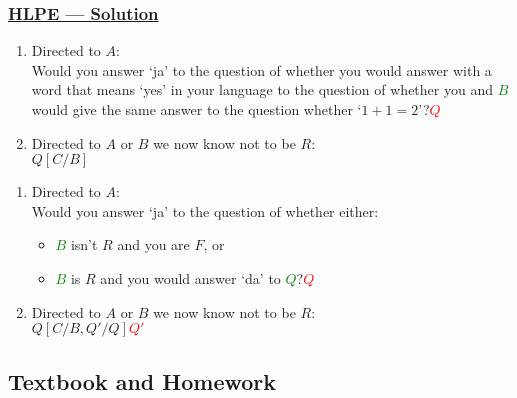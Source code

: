 \documentclass[UTF8,11pt,colorlinks,compress,openany]{beamer}%
\begin{document}
\begin{frame}\frametitle{\href{http://philsci-archive.pitt.edu/9490/1/devious.pdf}{HLPE --- Solution}}
\vspace{-3pt}
\setlength\abovedisplayskip{0pt}
\setlength\belowdisplayskip{0pt}
	\begin{solution}
		\begin{enumerate}
			\item Directed to $A$:\\
			Would you answer `ja' to the question of whether you would answer with a word that means `yes' in your language to the question of whether you and \textcolor{green}{$B$} would give the same answer to the question whether `$1+1=2$'?\hfill \textcolor{red}{$Q$}
			\item Directed to $A$ or $B$ we now know not to be $R$:\\
			$Q[C/B]$
		\end{enumerate}
	\end{solution}\vspace{-1ex}
	\begin{solution}
		\begin{enumerate}
			\item Directed to $A$:\\
			Would you answer `ja' to the question of whether either:
			\begin{itemize}
				\item \textcolor{green}{$B$} isn't $R$ and you are $F$, or
				\item \textcolor{green}{$B$} is $R$ and you would answer `da' to \textcolor{green}{$Q$}?\hfill \textcolor{red}{$Q$}
			\end{itemize}
			\item Directed to $A$ or $B$ we now know not to be $R$:\\
			$Q[C/B,Q'/Q]$\hfill \textcolor{red}{$Q'$}
		\end{enumerate}
	\end{solution}
\end{frame}

\subsection{Textbook and Homework}
\end{document}
